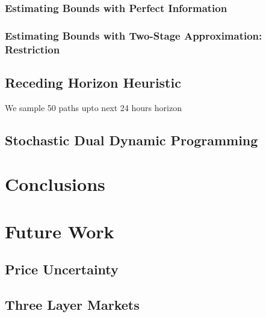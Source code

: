 \documentclass[11pt,twoside]{article}
\begin{document}
\subsubsection{Estimating Bounds with Perfect Information}
\subsubsection{Estimating Bounds with Two-Stage Approximation: Restriction}
\subsection{Receding Horizon Heuristic}
We sample 50 paths upto next 24 hours horizon 
\subsection{Stochastic Dual Dynamic Programming}
\section{Conclusions}
\section{Future Work}
\subsection{Price Uncertainty}
\subsection{Three Layer Markets}




\end{document}
